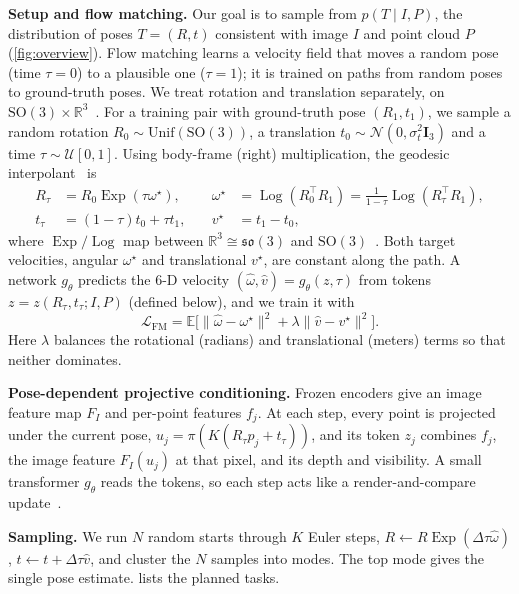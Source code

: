 \documentclass{article}
\newcommand{\R}{\mathbb{R}}
\newcommand{\SO}{\mathrm{SO}(3)}
\newcommand{\so}{\mathfrak{so}(3)}
\newcommand{\Log}{\operatorname{Log}}
\newcommand{\Exp}{\operatorname{Exp}}
\begin{document}
\textbf{Setup and flow matching.}
Our goal is to sample from $p(T\mid I,P)$, the distribution of poses $T=(R,t)$ consistent with image $I$ and point cloud $P$ (\cref{fig:overview}).
Flow matching learns a velocity field that moves a random pose (time $\tau=0$) to a plausible one ($\tau=1$); it is trained on paths from random poses to ground-truth poses.
We treat rotation and translation separately, on $\SO\times\R^3$~\cite{yim2023framediff,bose2024foldflow}.
For a training pair with ground-truth pose $(R_1,t_1)$, we sample a random rotation $R_0\sim\mathrm{Unif}(\SO)$, a translation $t_0\sim\mathcal N(0,\sigma_t^2\mathbf{I}_3)$ and a time $\tau\sim\mathcal U[0,1]$.
Using body-frame (right) multiplication, the geodesic interpolant~\cite{chen2024riemannian} is
\begin{equation}
\begin{aligned}
  R_\tau&=R_0\Exp(\tau\omega^\star), &\quad \omega^\star&=\Log(R_0^\top R_1)=\tfrac{1}{1-\tau}\Log(R_\tau^\top R_1),\\
  t_\tau&=(1-\tau)t_0+\tau t_1, &\quad v^\star&=t_1-t_0,
\end{aligned}
\end{equation}
where $\Exp/\Log$ map between $\R^3\cong\so$ and $\SO$~\cite{sola2018micro}.
Both target velocities, angular $\omega^\star$ and translational $v^\star$, are constant along the path.
A network $g_\theta$ predicts the 6-D velocity $(\hat\omega,\hat v)=g_\theta(z,\tau)$ from tokens $z=z(R_\tau,t_\tau;I,P)$ (defined below), and we train it with
\begin{equation}
  \mathcal L_{\mathrm{FM}}=\mathbb E\big[\|\hat\omega-\omega^\star\|^2+\lambda\|\hat v-v^\star\|^2\big].
\end{equation}
Here $\lambda$ balances the rotational (radians) and translational (meters) terms so that neither dominates.

\textbf{Pose-dependent projective conditioning.}
Frozen encoders give an image feature map $F_I$ and per-point features $f_j$.
At each step, every point is projected under the current pose, $u_j=\pi(K(R_\tau p_j+t_\tau))$, and its token $z_j$ combines $f_j$, the image feature $F_I(u_j)$ at that pixel, and its depth and visibility.
A small transformer $g_\theta$ reads the tokens, so each step acts like a render-and-compare update~\cite{cattaneo2019cmrnet}.

\textbf{Sampling.}
We run $N$ random starts through $K$ Euler steps, $R\!\leftarrow\!R\Exp(\Delta\tau\hat\omega)$, $t\!\leftarrow\!t+\Delta\tau\hat v$, and cluster the $N$ samples into modes. The top mode gives the single pose estimate.  lists the planned tasks.
\end{document}
